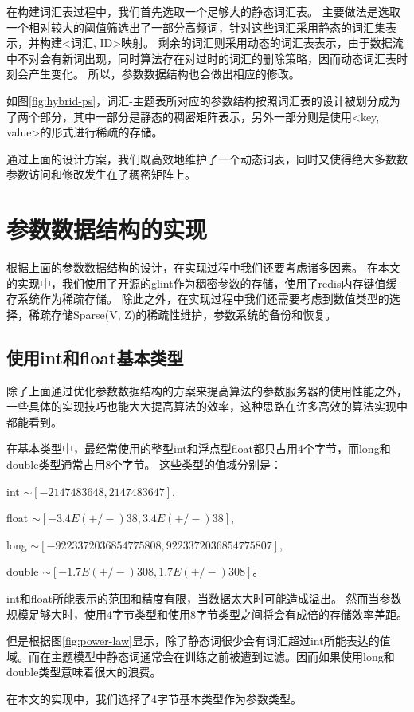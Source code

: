 在构建词汇表过程中，我们首先选取一个足够大的静态词汇表。
主要做法是选取一个相对较大的阈值筛选出了一部分高频词，针对这些词汇采用静态的词汇集表示，并构建<词汇, ID>映射。
剩余的词汇则采用动态的词汇表表示，由于数据流中不对会有新词出现，同时算法存在对过时的词汇的删除策略，因而动态词汇表时刻会产生变化。
所以，参数数据结构也会做出相应的修改。

如图\ref{fig:hybrid-ps}，词汇-主题表所对应的参数结构按照词汇表的设计被划分成为了两个部分，其中一部分是静态的稠密矩阵表示，另外一部分则是使用<key, value>的形式进行稀疏的存储。

通过上面的设计方案，我们既高效地维护了一个动态词表，同时又使得绝大多数数参数访问和修改发生在了稠密矩阵上。

\section{参数数据结构的实现}
根据上面的参数数据结构的设计，在实现过程中我们还要考虑诸多因素。
在本文的实现中，我们使用了开源的glint\cite{glint}作为稠密参数的存储，使用了redis\cite{redis}内存键值缓存系统作为稀疏存储。
除此之外，在实现过程中我们还需要考虑到数值类型的选择，稀疏存储Sparse(V, Z)的稀疏性维护，参数系统的备份和恢复。

\subsection{使用int和float基本类型}
除了上面通过优化参数数据结构的方案来提高算法的参数服务器的使用性能之外，
一些具体的实现技巧也能大大提高算法的效率，这种思路在许多高效的算法实现中都能看到。

在基本类型中，最经常使用的整型int和浮点型float都只占用4个字节，而long和double类型通常占用8个字节。
这些类型的值域分别是：

int $\sim [-2147483648, 2147483647]$,

float $\sim [-3.4E(+/-)38, 3.4E(+/-)38]$, 

long $\sim [-9223372036854775808, 9223372036854775807]$,
	 
double $\sim [-1.7E(+/-)308, 1.7E(+/-)308]$。

int和float所能表示的范围和精度有限，当数据太大时可能造成溢出。
然而当参数规模足够大时，使用4字节类型和使用8字节类型之间将会有成倍的存储效率差距。

但是根据图\ref{fig:power-law}显示，除了静态词很少会有词汇超过int所能表达的值域。而在主题模型中静态词通常会在训练之前被遭到过滤。因而如果使用long和double类型意味着很大的浪费。

在本文的实现中，我们选择了4字节基本类型作为参数类型。


